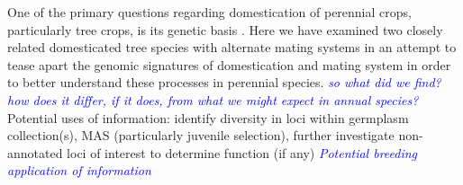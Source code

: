 \documentclass[12pt]{article}
\newcommand{\dv}[1]{\textcolor{blue}{\emph{#1}}}
\begin{document}
One of the primary questions regarding domestication of perennial crops, particularly tree crops, is its genetic basis \citep{miller2011forest}. %
%
Here we have examined two closely related domesticated tree species with alternate mating systems in an attempt to tease apart the genomic signatures of domestication and mating system in order to better understand these processes in perennial species.
%
\dv{so what did we find? how does it differ, if it does, from what we might expect in annual species?}
%
Potential uses of information: identify diversity in loci within germplasm collection(s), MAS (particularly juvenile selection), further investigate non-annotated loci of interest to determine function (if any)
%
%
\dv{Potential breeding application of information}
%
%
%
%
\end{document}
